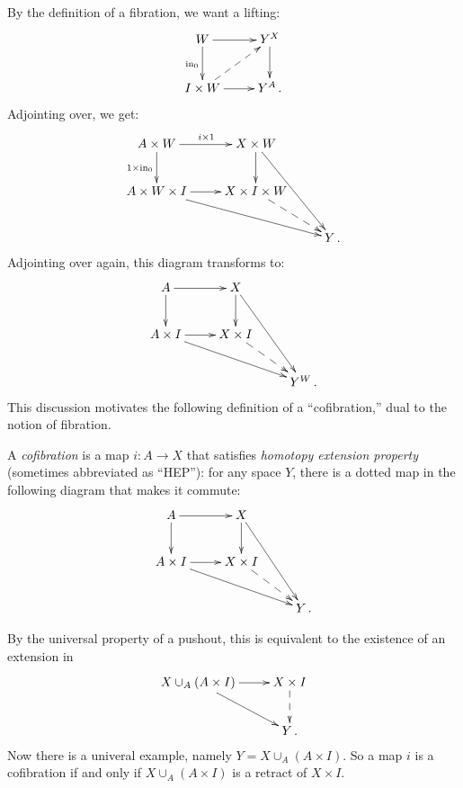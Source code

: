 By the definition of a fibration, we want a lifting:
\begin{equation*}
    \xymatrix{
	W\ar[r]\ar[d]_{\mathrm{in}_0} & Y^X\ar[d]\\
	I\times W\ar@{-->}[ur]\ar[r] & Y^A\,.
    }
\end{equation*}
Adjointing over, we get:
\begin{equation*}
    \xymatrix{
	A\times W\ar[r]^{i\times 1}\ar[d]_{1\times \mathrm{in}_0} & X\times W\ar[d]\ar[ddr]& \\
	A\times W\times I \ar[r]\ar[drr] & X\times I\times W\ar@{-->}[dr] & \\
	& & Y\,.
    }
\end{equation*}
Adjointing over again, this diagram transforms to:
\begin{equation*}
    \xymatrix{
	A\ar[r]\ar[d] & X\ar[d]\ar[ddr] & \\
	A\times I\ar[r]\ar[drr] & X\times I\ar@{-->}[dr] & \\
	& & Y^W\,.
    }
\end{equation*}
This discussion motivates the following definition of a ``cofibration,''
dual to the notion of fibration.

\begin{definition}\label{cofibration}
A {\em cofibration} is a map $i:A\to X$ that satisfies 
    \emph{homotopy extension property} (sometimes abbreviated as ``HEP''):
    for any space $Y$, there is a dotted map in the following diagram that makes it commute:
    \begin{equation*}
    \xymatrix{
	A\ar[r]\ar[d] & X\ar[d]\ar[ddr] & \\
	A\times I\ar[r]\ar[drr] & X\times I\ar@{-->}[dr] & \\
	& & Y\,.
    }
    \end{equation*}
\end{definition}
By the universal property of a pushout, this is equivalent to the existence
of an extension in 
\begin{equation*}
    \xymatrix{
	X\cup_A (A\times I)\ar[r]\ar[dr] & X\times I\ar@{-->}[d]\\
	& Y\,.
    }
\end{equation*}
Now there is a univeral example, namely $Y=X\cup_A(A\times I)$. So a map
$i$ is a cofibration if and only if $X\cup_A (A\times I)$ is a retract of 
$X\times I$.

